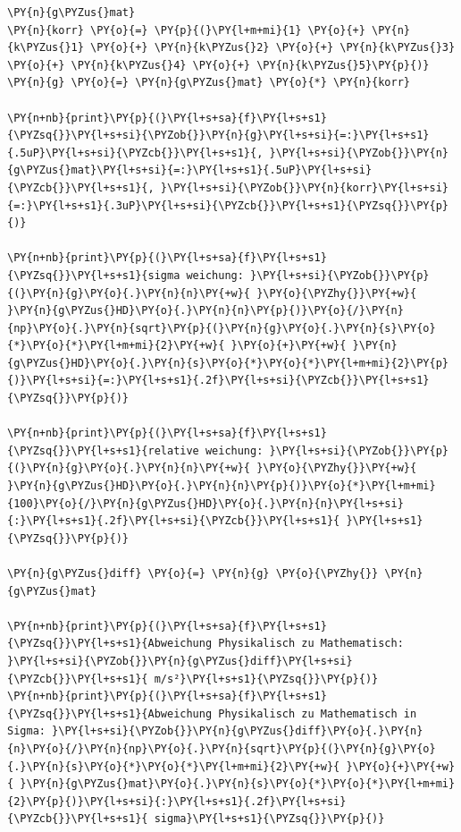     \begin{tcolorbox}[breakable, size=fbox, boxrule=1pt, pad at break*=1mm,colback=cellbackground, colframe=cellborder]
\begin{Verbatim}[commandchars=\\\{\}]
\PY{n}{g\PYZus{}mat}
\PY{n}{korr} \PY{o}{=} \PY{p}{(}\PY{l+m+mi}{1} \PY{o}{+} \PY{n}{k\PYZus{}1} \PY{o}{+} \PY{n}{k\PYZus{}2} \PY{o}{+} \PY{n}{k\PYZus{}3} \PY{o}{+} \PY{n}{k\PYZus{}4} \PY{o}{+} \PY{n}{k\PYZus{}5}\PY{p}{)}
\PY{n}{g} \PY{o}{=} \PY{n}{g\PYZus{}mat} \PY{o}{*} \PY{n}{korr}

\PY{n+nb}{print}\PY{p}{(}\PY{l+s+sa}{f}\PY{l+s+s1}{\PYZsq{}}\PY{l+s+si}{\PYZob{}}\PY{n}{g}\PY{l+s+si}{=:}\PY{l+s+s1}{.5uP}\PY{l+s+si}{\PYZcb{}}\PY{l+s+s1}{, }\PY{l+s+si}{\PYZob{}}\PY{n}{g\PYZus{}mat}\PY{l+s+si}{=:}\PY{l+s+s1}{.5uP}\PY{l+s+si}{\PYZcb{}}\PY{l+s+s1}{, }\PY{l+s+si}{\PYZob{}}\PY{n}{korr}\PY{l+s+si}{=:}\PY{l+s+s1}{.3uP}\PY{l+s+si}{\PYZcb{}}\PY{l+s+s1}{\PYZsq{}}\PY{p}{)}

\PY{n+nb}{print}\PY{p}{(}\PY{l+s+sa}{f}\PY{l+s+s1}{\PYZsq{}}\PY{l+s+s1}{sigma weichung: }\PY{l+s+si}{\PYZob{}}\PY{p}{(}\PY{n}{g}\PY{o}{.}\PY{n}{n}\PY{+w}{ }\PY{o}{\PYZhy{}}\PY{+w}{ }\PY{n}{g\PYZus{}HD}\PY{o}{.}\PY{n}{n}\PY{p}{)}\PY{o}{/}\PY{n}{np}\PY{o}{.}\PY{n}{sqrt}\PY{p}{(}\PY{n}{g}\PY{o}{.}\PY{n}{s}\PY{o}{*}\PY{o}{*}\PY{l+m+mi}{2}\PY{+w}{ }\PY{o}{+}\PY{+w}{ }\PY{n}{g\PYZus{}HD}\PY{o}{.}\PY{n}{s}\PY{o}{*}\PY{o}{*}\PY{l+m+mi}{2}\PY{p}{)}\PY{l+s+si}{=:}\PY{l+s+s1}{.2f}\PY{l+s+si}{\PYZcb{}}\PY{l+s+s1}{\PYZsq{}}\PY{p}{)}

\PY{n+nb}{print}\PY{p}{(}\PY{l+s+sa}{f}\PY{l+s+s1}{\PYZsq{}}\PY{l+s+s1}{relative weichung: }\PY{l+s+si}{\PYZob{}}\PY{p}{(}\PY{n}{g}\PY{o}{.}\PY{n}{n}\PY{+w}{ }\PY{o}{\PYZhy{}}\PY{+w}{ }\PY{n}{g\PYZus{}HD}\PY{o}{.}\PY{n}{n}\PY{p}{)}\PY{o}{*}\PY{l+m+mi}{100}\PY{o}{/}\PY{n}{g\PYZus{}HD}\PY{o}{.}\PY{n}{n}\PY{l+s+si}{:}\PY{l+s+s1}{.2f}\PY{l+s+si}{\PYZcb{}}\PY{l+s+s1}{ }\PY{l+s+s1}{\PYZsq{}}\PY{p}{)}

\PY{n}{g\PYZus{}diff} \PY{o}{=} \PY{n}{g} \PY{o}{\PYZhy{}} \PY{n}{g\PYZus{}mat}

\PY{n+nb}{print}\PY{p}{(}\PY{l+s+sa}{f}\PY{l+s+s1}{\PYZsq{}}\PY{l+s+s1}{Abweichung Physikalisch zu Mathematisch: }\PY{l+s+si}{\PYZob{}}\PY{n}{g\PYZus{}diff}\PY{l+s+si}{\PYZcb{}}\PY{l+s+s1}{ m/s²}\PY{l+s+s1}{\PYZsq{}}\PY{p}{)}
\PY{n+nb}{print}\PY{p}{(}\PY{l+s+sa}{f}\PY{l+s+s1}{\PYZsq{}}\PY{l+s+s1}{Abweichung Physikalisch zu Mathematisch in Sigma: }\PY{l+s+si}{\PYZob{}}\PY{n}{g\PYZus{}diff}\PY{o}{.}\PY{n}{n}\PY{o}{/}\PY{n}{np}\PY{o}{.}\PY{n}{sqrt}\PY{p}{(}\PY{n}{g}\PY{o}{.}\PY{n}{s}\PY{o}{*}\PY{o}{*}\PY{l+m+mi}{2}\PY{+w}{ }\PY{o}{+}\PY{+w}{ }\PY{n}{g\PYZus{}mat}\PY{o}{.}\PY{n}{s}\PY{o}{*}\PY{o}{*}\PY{l+m+mi}{2}\PY{p}{)}\PY{l+s+si}{:}\PY{l+s+s1}{.2f}\PY{l+s+si}{\PYZcb{}}\PY{l+s+s1}{ sigma}\PY{l+s+s1}{\PYZsq{}}\PY{p}{)}
\end{Verbatim}
\end{tcolorbox}

